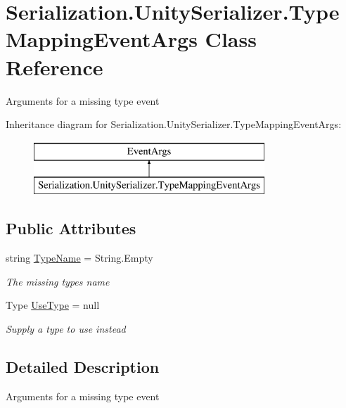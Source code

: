 \hypertarget{class_serialization_1_1_unity_serializer_1_1_type_mapping_event_args}{}\section{Serialization.\+Unity\+Serializer.\+Type\+Mapping\+Event\+Args Class Reference}
\label{class_serialization_1_1_unity_serializer_1_1_type_mapping_event_args}


Arguments for a missing type event  


Inheritance diagram for Serialization.\+Unity\+Serializer.\+Type\+Mapping\+Event\+Args\+:\begin{figure}[H]
\begin{center}
\leavevmode
\includegraphics[height=2.000000cm]{class_serialization_1_1_unity_serializer_1_1_type_mapping_event_args}
\end{center}
\end{figure}
\subsection*{Public Attributes}
\begin{DoxyCompactItemize}
\item 
string \hyperlink{class_serialization_1_1_unity_serializer_1_1_type_mapping_event_args_a20b323b088989941dd3fe2b7173053fe}{Type\+Name} = String.\+Empty
\begin{DoxyCompactList}\small\item\em The missing types name \end{DoxyCompactList}\item 
Type \hyperlink{class_serialization_1_1_unity_serializer_1_1_type_mapping_event_args_acbc5dff700b65902b74c31c24ad9cf25}{Use\+Type} = null
\begin{DoxyCompactList}\small\item\em Supply a type to use instead \end{DoxyCompactList}\end{DoxyCompactItemize}


\subsection{Detailed Description}
Arguments for a missing type event 



